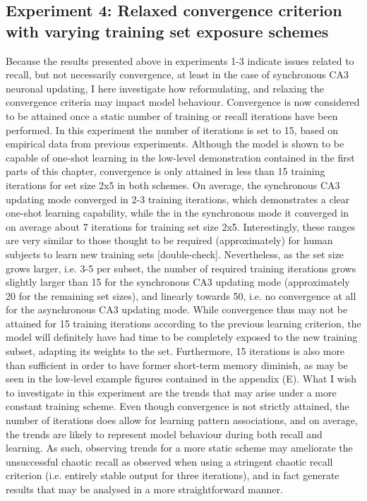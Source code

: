 \subsection{Experiment 4: Relaxed convergence criterion with varying training set exposure schemes}

Because the results presented above in experiments 1-3 indicate issues related to recall, but not necessarily convergence, at least in the case of synchronous CA3 neuronal updating, I here investigate how reformulating, and relaxing the convergence criteria may impact model behaviour. Convergence is now considered to be attained once a static number of training or recall iterations have been performed. In this experiment the number of iterations is set to 15, based on empirical data from previous experiments. Although the model is shown to be capable of one-shot learning in the low-level demonstration contained in the first parts of this chapter, convergence is only attained in less than 15 training iterations for set size 2x5 in both schemes. On average, the synchronous CA3 updating mode converged in 2-3 training iterations, which demonstrates a clear one-shot learning capability, while the in the synchronous mode it converged in on average about 7 iterations for training set size 2x5. Interestingly, these ranges are very similar to those thought to be required (approximately) for human subjects to learn new training sets \citep{Rolls1998chpt6} [double-check]. Nevertheless, as the set size grows larger, i.e. 3-5 per subset, the number of required training iterations grows slightly larger than 15 for the synchronous CA3 updating mode (approximately 20 for the remaining set sizes), and linearly towards 50, i.e. no convergence at all for the asynchronous CA3 updating mode.
While convergence thus may not be attained for 15 training iterations according to the previous learning criterion, the model will definitely have had time to be completely exposed to the new training subset, adapting its weights to the set. Furthermore, 15 iterations is also more than sufficient in order to have former short-term memory diminish, as may be seen in the low-level example figures contained in the appendix (E).
What I wish to investigate in this experiment are the trends that may arise under a more constant training scheme. Even though convergence is not strictly attained, the number of iterations does allow for learning pattern associations, and on average, the trends are likely to represent model behaviour during both recall and learning. As such, observing trends for a more static scheme may ameliorate the unsuccessful chaotic recall as observed when using a stringent chaotic recall criterion (i.e. entirely stable output for three iterations), and in fact generate results that may be analysed in a more straightforward manner.


